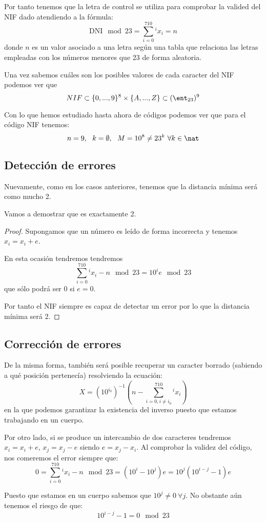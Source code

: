 Por tanto tenemos que la letra de control se utiliza para comprobar la valided del NIF dado atendiendo a la fórmula:
\[\text{DNI}\mod 23 = \sum_{i=0}^710^{i}x_i= n\]
donde $n$ es un valor asociado a una letra según una tabla que relaciona las letras empleadas con los números menores que 23 de forma aleatoria.

Una vez sabemos cuáles son los posibles valores de cada caracter del NIF podemos ver que
\[NIF \subset \{0,...,9\}^8 \times \{A,...,Z\} \subset (\ent_{23})^9\]

Con lo que hemos estudiado hasta ahora de códigos podemos ver que para el código NIF tenemos:
\[n=9, \ \ k=\emptyset, \ \ M = 10^{8}\neq 23^k \ \forall k \in \nat\]

\subsection{Detección de errores}
Nuevamente, como en los casos anteriores, tenemos que la distancia mínima será como mucho 2.

Vamos a demostrar que es exactamente 2.
\begin{proof}
Supongamos que un número es leído de forma incorrecta y tenemos $x_i=x_i+e$.

En esta ocasión tendremos tendremos
\[\sum_{i=0}^710^{i}x_i - n \mod 23 = 10^{i} e \mod 23\]
que sólo podrá ser 0 si $e=0$.

Por tanto el NIF siempre es capaz de detectar un error por lo que la distancia mínima será 2.
\end{proof}

\subsection{Corrección de errores}
De la misma forma, también será posible recuperar un caracter borrado (sabiendo a qué posición pertenecía) resolviendo la ecuación:
\[X=(10^{i_0})^{-1} \left( n- \sum_{i=0,i\neq i_0}^710^{i}x_i \right)\]
en la que podemos garantizar la existencia del inverso puesto que estamos trabajando en un cuerpo.

Por otro lado, si se produce un intercambio de dos caracteres tendremos $x_i=x_i+e$, $x_j=x_j-e$ siendo $e=x_j-x_i$. Al comprobar la validez del código, nos comeremos el error siempre que:
\[0 = \sum_{i=0}^710^{i}x_i - n \mod 23 =(10^i-10^j)e = 10^j(10^{i-j}-1)e\]

Puesto que estamos en un cuerpo sabemos que $10^j\neq 0 \ \forall j$. No obstante aún tenemos el riesgo de que:
\[10^{i-j}-1 = 0 \mod 23\]

